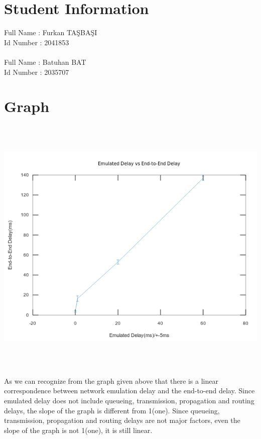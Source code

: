\documentclass[12pt]{article}
\begin{document}
\section*{Student Information } 
Full Name : Furkan TAŞBAŞI \\ 	
Id Number : 2041853 \\		
\\	
Full Name : Batuhan BAT \\
Id Number : 2035707 \\

\section*{Graph}
\includegraphics[height=360pt]{graph.png}

As we can recognize from the graph given above that there is a linear correspondence between network emulation delay and the end-to-end delay. Since emulated delay does not include queueing, transmission, propagation and routing delays, the slope of the graph is different from 1(one). Since queueing, transmission, propagation and routing delays are not major factors, even the slope of the graph is not 1(one), it is still linear.
\end{document}
